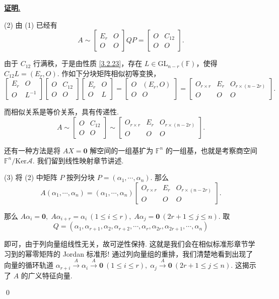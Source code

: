 \documentclass[10pt,openany]{article}
\theoremstyle{thmstyle} %
\theoremstyle{defstyle} %
\theoremstyle{prostyle} %
\theoremstyle{exastyle}
\theoremstyle{remstyle}
\renewenvironment{proof}[1][证明]{\par\underline{\textbf{#1.}} \;\fangsong}{\qed\par}
\newcommand{\F}{\mathbb{F}}
\begin{document}
\begin{proof}
	
	(2) 由 (1) 已经有
	\[ A \sim \begin{bmatrix}
		E_r & O \\
		O & O
	\end{bmatrix} QP= \begin{bmatrix}
	O & C_{12} \\
	O & O
	\end{bmatrix}. \]
	
	由于 \( C_{12} \) 行满秩，于是由性质 \ref{3.2.23}，存在 \( L \in \text{GL}_{n-r}(\F) \)，使得 \( C_{12}L=(E_r,O) \). 作如下分块矩阵相似初等变换，
	\[ \begin{bmatrix}
		E_r & O \\
		O & L^{-1}
	\end{bmatrix}\begin{bmatrix}
	O & C_{12} \\
	O & O
	\end{bmatrix}\begin{bmatrix}
	E_r & O \\
	O & L
	\end{bmatrix}=\begin{bmatrix}
	O & (E_r,O) \\
	O & O
	\end{bmatrix}=\begin{bmatrix}
	O_{r \times r} & E_r & O_{r \times (n-2r)} \\
	O & O & O
	\end{bmatrix}. \]
	
	而相似关系是等价关系，具有传递性.
	\[ A \sim \begin{bmatrix}
		O & C_{12} \\
		O & O
	\end{bmatrix} \sim \begin{bmatrix}
	O_{r \times r} & E_r & O_{r \times (n-2r)} \\
	O & O & O
	\end{bmatrix}. \]
	
	还有一种方法是将 \( AX=\bm{0} \) 解空间的一组基扩为 \( \F^n \) 的一组基，也就是考察商空间 \( \F^n/ \mathrm{Ker}\mathscr{A} \). 我们留到线性映射章节讲述.
	
	(3) 将 (2) 中矩阵 \( P \) 按列分块 \( P=(\alpha_1,\cdots,\alpha_n) \). 那么
	\[ A(\alpha_1,\cdots,\alpha_n)=(\alpha_1,\cdots,\alpha_n) \begin{bmatrix}
		O_{r \times r} & E_r & O_{r \times (n-2r)} \\
		O & O & O
	\end{bmatrix}. \]
	
	那么 \( A\alpha_i=\bm{0}, \; A\alpha_{i+r}=\alpha_i \ (1 \leq i \leq r), \; A\alpha_j=\bm{0} \ (2r+1 \leq j \leq n)  \). 取
	\[  Q=(\alpha_1,\alpha_{r+1},\alpha_2,\alpha_{r+2},\cdots,\alpha_r,\alpha_{2r},\alpha_{2r+1},\cdots,\alpha_{n}) \]
	
	即可，由于列向量组线性无关，故可逆性保持. 这就是我们会在相似标准形章节学习到的幂零矩阵的 Jordan 标准形! 通过列向量组的重排，我们清楚地看到出现了向量的循环轨道 \( \alpha_{r+i} \overset{A}{\to} \alpha_i \overset{A}{\to} \bm{0} \ (1 \leq i \leq r), \; \alpha_{j}  \overset{A}{\to} \bm{0} \ (2r+1 \leq j \leq n) \). 这揭示了 \( A \) 的广义特征向量.
	
\end{proof}
\end{document}
